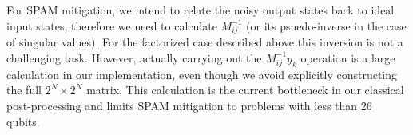 \documentclass[
prx,
superscriptaddress,
twocolumn,
longbibliography
]{revtex4-1}
\begin{document}
For SPAM mitigation, we intend to relate the noisy output states back to ideal input states, therefore we need to calculate $M_{ij}^{-1}$ (or its psuedo-inverse in the case of singular values). For the factorized case described above this inversion is not a challenging task. However, actually carrying out the $M_{ij}^{-1} y_k$ operation is a large calculation in our implementation, even though we avoid explicitly constructing the full $2^N \times 2^N$ matrix. This calculation is the current bottleneck in our classical post-processing and limits SPAM mitigation to problems with less than 26 qubits.



\end{document}
